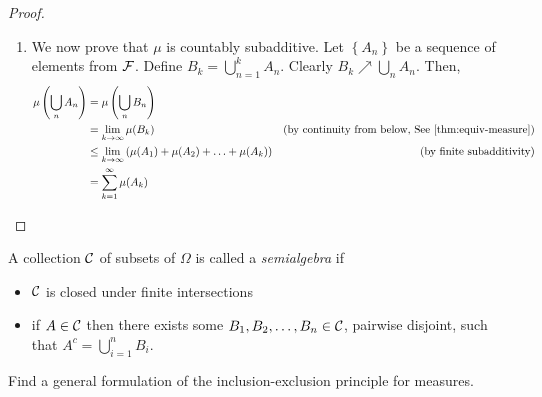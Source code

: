 \begin{proof}
\begin{enumerate}[label=(\arabic*)]
        \item We now prove that $\mu$ is countably subadditive. Let $\left\{ A_n \right\}$ be a sequence of elements from ${\cal F}$. Define $B_k = \bigcup_{n=1}^{k} A_n$. Clearly $B_k \nearrow \bigcup_{n} A_n$.
        Then, 
        \begin{align*}
            \mu \left( \bigcup_n A_n \right) &= \mu \left( \bigcup_n B_n \right) & \\
                                          &= \lim_{k \to \infty} \mu (B_k) & \text{(by continuity from below, See } \ref{thm:equiv-measure}) \\ 
                                          &\le \lim_{k \to \infty} \left( \mu(A_1) + \mu(A_2) + \ldots + \mu(A_k) \right) & \text{(by finite subadditivity)} \\
                                          &= \sum_{k=1}^{\infty} \mu (A_k)
        \end{align*}
    \end{enumerate}
\end{proof}

\begin{definition}
    \label{def:semialgebra}
    A collection ${\cal C}$ of subsets of $\Omega$ is called a \emph{semialgebra} if 
    \begin{itemize}
        \item ${\cal C}$ is closed under finite intersections
        \item if $A\in {\cal C}$ then there exists some $B_1, B_2 , \ldots , B_n \in {\cal C}$, pairwise disjoint, such that $A^c = \bigcup_{i=1}^{n} B_i$.
    \end{itemize}
\end{definition}

\begin{exercise}
    Find a general formulation of the inclusion-exclusion principle for measures.
\end{exercise}
